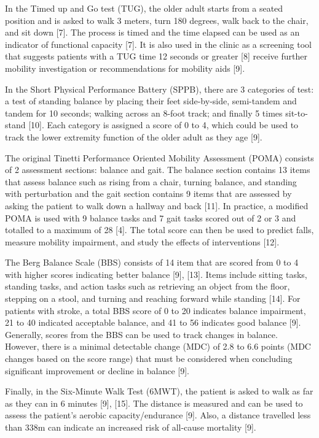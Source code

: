 In the Timed up and Go test (TUG), the older adult starts from a seated position and is asked 
to walk 3 meters, turn 180 degrees, walk back to the chair, and sit down [7]. The process is 
timed and the time elapsed can be used as an indicator of functional capacity [7]. It is also 
used in the clinic as a screening tool that suggests patients with a TUG time 12 seconds or 
greater [8] receive further mobility investigation or recommendations for mobility aids [9].

In the Short Physical Performance Battery (SPPB), there are 3 categories of test: a test of 
standing balance by placing their feet side-by-side, semi-tandem and tandem for 10 seconds; 
walking across an 8-foot track; and finally 5 times sit-to-stand [10]. Each category is assigned 
a score of 0 to 4, which could be used to track the lower extremity function of the older adult as 
they age [9]. 

The original Tinetti Performance Oriented Mobility Assessment (POMA) consists of 2 assessment sections: 
balance and gait. The balance section contains 13 items that assess balance such as rising from a chair, 
turning balance, and standing with perturbation and the gait section contains 9 items that are assessed 
by asking the patient to walk down a hallway and back [11]. In practice, a modified POMA is used with 
9 balance tasks and 7 gait tasks scored out of 2 or 3 and totalled to a maximum of 28 [4]. The total 
score can then be used to predict falls, measure mobility impairment, and study the effects of 
interventions [12].  

The Berg Balance Scale (BBS) consists of 14 item that are scored from 0 to 4 with higher scores 
indicating better balance [9], [13]. Items include sitting tasks, standing tasks, and action tasks 
such as retrieving an object from the floor, stepping on a stool, and turning and reaching forward 
while standing [14]. For patients with stroke, a total BBS score of 0 to 20 indicates balance impairment, 
21 to 40 indicated acceptable balance, and 41 to 56 indicates good balance [9]. Generally, scores from the 
BBS can be used to track changes in balance. However, there is a minimal detectable change (MDC) of 2.8 
to 6.6 points (MDC changes based on the score range) that must be considered when concluding significant 
improvement or decline in balance [9].

Finally, in the Six-Minute Walk Test (6MWT), the patient is asked to walk as far as they can in 6 minutes 
[9], [15]. The distance is measured and can be used to assess the patient’s aerobic capacity/endurance [9]. 
Also, a distance travelled less than 338m can indicate an increased risk of all-cause mortality [9]. 


